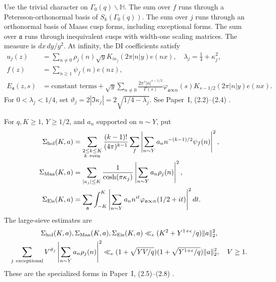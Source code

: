 Use the trivial character on $\Gamma_0(q)\backslash\mathbb H$.
The sum over $f$ runs through a Petersson-orthonormal basis of
$S_k(\Gamma_0(q))$. The sum over $j$ runs through an orthonormal basis of
Maass cusp forms, including exceptional forms. The sum over $\mathfrak a$
runs through inequivalent cusps with width-one scaling matrices.
The measure is $dx\,dy/y^2$.
At infinity, the DI coefficients satisfy
\begin{equation}\label{eq:di-normalization}
 \begin{aligned}
 u_j(z)&=\sum_{n\ne0}\rho_j(n)\sqrt y
            K_{i\kappa_j}(2\pi|n|y)e(nx),\quad
 \lambda_j=\tfrac14+\kappa_j^2,\\
 f(z)&=\sum_{n\ge1}\psi_f(n)e(nz),\\
 E_{\mathfrak a}(z,s)&=\text{constant terms}
 +\sqrt y\sum_{n\ne0}\frac{2\pi^s|n|^{s-1/2}}{\Gamma(s)}
       \varphi_{\mathfrak a\infty n}(s)
       K_{s-1/2}(2\pi|n|y)e(nx).
 \end{aligned}
\end{equation}
For $0<\lambda_j<1/4$, set
$\vartheta_j=2|\Im\kappa_j|=2\sqrt{1/4-\lambda_j}$.
See Paper~I, (2.2)--(2.4) \cite[(2.2)--(2.4), p.~5]{PaperI}.

\begin{fact}\label{fact:di-large-sieves}
For $q,K\ge1$, $Y\ge1/2$, and $a_n$ supported on $n\sim Y$,
put
\[
 \begin{aligned}
 \Sigma_{\rm hol}(K,a)&=\sum_{\substack{2\le k\le K\\k\ {\rm even}}}
 \frac{(k-1)!}{(4\pi)^{k-1}}\sum_f
 \left|\sum_{n\sim Y}a_nn^{-(k-1)/2}\psi_f(n)\right|^2,\\
 \Sigma_{\rm Maa}(K,a)&=\sum_{|\kappa_j|\le K}\frac1{\cosh(\pi\kappa_j)}
            \left|\sum_{n\sim Y}a_n\rho_j(n)\right|^2,\\
 \Sigma_{\rm Eis}(K,a)&=\sum_{\mathfrak a}\int_{-K}^K
 \left|\sum_{n\sim Y}a_nn^{it}
       \varphi_{\mathfrak a\infty n}(1/2+it)\right|^2dt.
 \end{aligned}
\]
The large-sieve estimates are
\begin{equation}\label{eq:di-large-sieves}
 \begin{gathered}
 \Sigma_{\rm hol}(K,a),\Sigma_{\rm Maa}(K,a),\Sigma_{\rm Eis}(K,a)
       \ll_\epsilon(K^2+Y^{1+\epsilon}/q)\|a\|_2^2,\\
 \sum_{j\ {\rm exceptional}}V^{\vartheta_j}
       \left|\sum_{n\sim Y}a_n\rho_j(n)\right|^2
 \ll_\epsilon(1+\sqrt{YV/q})(1+\sqrt{Y^{1+\epsilon}/q})\|a\|_2^2,
 \quad V\ge1.
 \end{gathered}
\end{equation}
These are the specialized forms in Paper~I, (2.5)--(2.8)
\cite[Theorem~2, (1.28)--(1.30), p.~230;
Theorem~5, (1.38), p.~232]{DI82}
\cite[(2.5)--(2.8), pp.~6--7]{PaperI}.
\end{fact}

